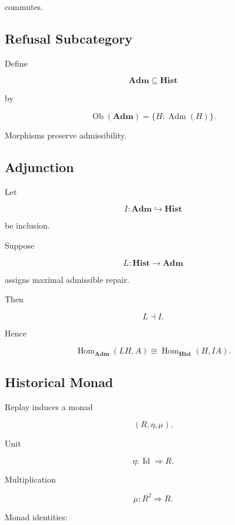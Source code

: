 \documentclass[12pt,oneside]{article}
\theoremstyle{definition}
\theoremstyle{remark}
\begin{document}
commutes.

\subsection*{Refusal Subcategory}

Define

\[
\mathbf{Adm}
\subseteq
\mathbf{Hist}
\]

by

\[
\operatorname{Ob}(\mathbf{Adm})
=
\{
H
:
\operatorname{Adm}(H)
\}.
\]

Morphisms preserve admissibility.

\subsection*{Adjunction}

Let

\[
I
:
\mathbf{Adm}
\hookrightarrow
\mathbf{Hist}
\]

be inclusion.

Suppose

\[
L
:
\mathbf{Hist}
\rightarrow
\mathbf{Adm}
\]

assigns maximal admissible repair.

Then

\[
L\dashv I.
\]

Hence

\[
\operatorname{Hom}_{\mathbf{Adm}}
(LH,A)
\cong
\operatorname{Hom}_{\mathbf{Hist}}
(H,IA).
\]

\subsection*{Historical Monad}

Replay induces a monad

\[
(R,\eta,\mu).
\]

Unit

\[
\eta
:
\operatorname{Id}
\Rightarrow
R.
\]

Multiplication

\[
\mu
:
R^2
\Rightarrow
R.
\]

Monad identities:
\end{document}
